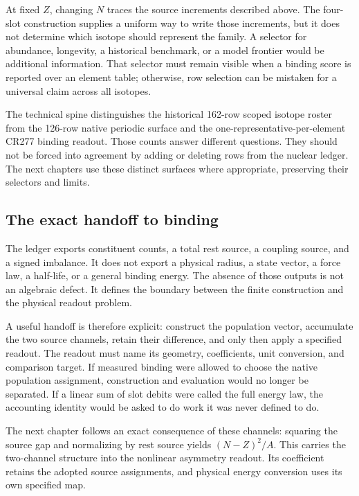 At fixed $Z$, changing $N$ traces the source increments described above. The four-slot construction supplies a uniform way to write those increments, but it does not determine which isotope should represent the family. A selector for abundance, longevity, a historical benchmark, or a model frontier would be additional information. That selector must remain visible when a binding score is reported over an element table; otherwise, row selection can be mistaken for a universal claim across all isotopes.

The technical spine distinguishes the historical 162-row scoped isotope roster from the 126-row native periodic surface and the one-representative-per-element CR277 binding readout. Those counts answer different questions. They should not be forced into agreement by adding or deleting rows from the nuclear ledger. The next chapters use these distinct surfaces where appropriate, preserving their selectors and limits.

\subsection{The exact handoff to binding}
\label{v2c4:handoff}

The ledger exports constituent counts, a total rest source, a coupling source, and a signed imbalance. It does not export a physical radius, a state vector, a force law, a half-life, or a general binding energy. The absence of those outputs is not an algebraic defect. It defines the boundary between the finite construction and the physical readout problem.

A useful handoff is therefore explicit: construct the population vector, accumulate the two source channels, retain their difference, and only then apply a specified readout. The readout must name its geometry, coefficients, unit conversion, and comparison target. If measured binding were allowed to choose the native population assignment, construction and evaluation would no longer be separated. If a linear sum of slot debits were called the full energy law, the accounting identity would be asked to do work it was never defined to do.

The next chapter follows an exact consequence of these channels: squaring the source gap and normalizing by rest source yields $(N-Z)^2/A$. This carries the two-channel structure into the nonlinear asymmetry readout. Its coefficient retains the adopted source assignments, and physical energy conversion uses its own specified map.
